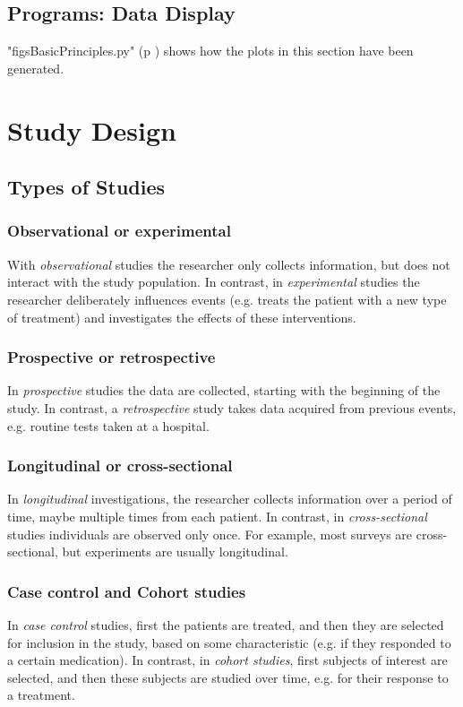 \subsection{Programs: Data Display}
\PyImg "figsBasicPrinciples.py" (p \pageref{py:BasicPrinciples}) shows how the plots in this section have been generated.

\section{Study Design}


\subsection{Types of Studies}

\subsubsection{Observational or experimental}
With \emph{observational} studies the researcher only collects information, but does not interact with the study population. In contrast, in \emph{experimental} studies the researcher deliberately influences events (e.g. treats the patient with a new type of treatment) and investigates the effects of these interventions.

\subsubsection{Prospective or retrospective}
In \emph{prospective} studies the data are collected, starting with the beginning of the study. In contrast, a \emph{retrospective} study takes data acquired from previous events, e.g. routine tests taken at a hospital.

\subsubsection{Longitudinal or cross-sectional}
In \emph{longitudinal} investigations, the researcher collects information over a period of time, maybe multiple times from each patient. In contrast, in \emph{cross-sectional} studies individuals are observed only once. For example, most surveys are cross-sectional, but experiments are usually longitudinal.

\subsubsection{Case control and Cohort studies}
In \emph{case control} studies, first the patients are treated, and then they are selected for inclusion in the study, based on some characteristic (e.g. if they responded to a certain medication). In contrast, in \emph{cohort studies}, first subjects of interest are selected, and then these subjects are studied over time, e.g. for their response to a treatment.

